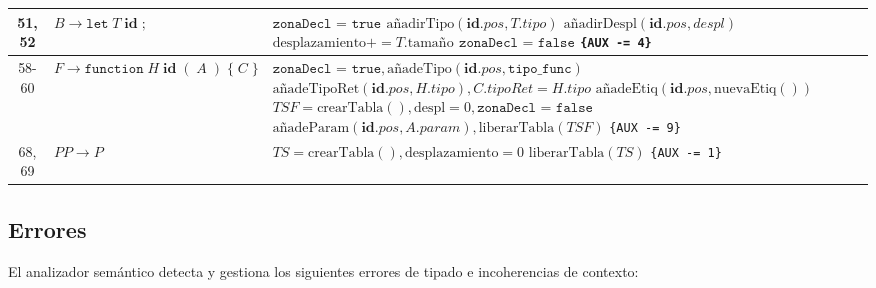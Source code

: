\documentclass{article}
\begin{document}
\begin{longtable}{|c|>{\raggedright\arraybackslash}p{5.5cm}|>{\raggedright\arraybackslash}p{10cm}|}
51, 52 & $B \to \texttt{let} \; T \; \mathbf{id} \; ;$ & 
$\texttt{zonaDecl = true}$ \newline
$\text{añadirTipo}(\mathbf{id}.pos, T.tipo)$ \newline
$\text{añadirDespl}(\mathbf{id}.pos, despl)$ \newline
$\text{desplazamiento} += T.\text{tamaño}$ \newline
$\texttt{zonaDecl = false}$ \newline
\texttt{\{AUX -= 4\}} \\ \hline

58-60 & $F \to \texttt{function} \; H \; \mathbf{id} \; ( \; A \; ) \; \{ \; C \; \}$ & 
$\texttt{zonaDecl = true}, \text{añadeTipo}(\mathbf{id}.pos, \texttt{tipo\_func})$ \newline
$\text{añadeTipoRet}(\mathbf{id}.pos, H.tipo), C.tipoRet = H.tipo$ \newline
$\text{añadeEtiq}(\mathbf{id}.pos, \text{nuevaEtiq}())$ \newline
$TSF = \text{crearTabla}(), \text{despl} = 0, \texttt{zonaDecl = false}$ \newline
$\text{añadeParam}(\mathbf{id}.pos, A.param), \text{liberarTabla}(TSF)$ \newline
\texttt{\{AUX -= 9\}} \\ \hline

68, 69 & $PP \to P$ & 
$TS = \text{crearTabla}(), \text{desplazamiento} = 0$ \newline
$\text{liberarTabla}(TS)$ \newline
\texttt{\{AUX -= 1\}} \\ \hline

\end{longtable}

\subsection{Errores}
El analizador semántico detecta y gestiona los siguientes errores de tipado e incoherencias de contexto:
\end{document}
